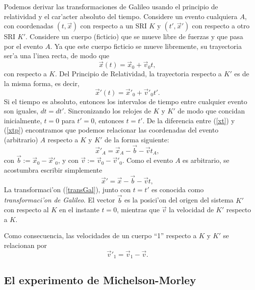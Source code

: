 Podemos derivar las transformaciones de Galileo usando el principio de
relatividad y el car'acter absoluto del tiempo. Considere un evento cualquiera
$A$, con coordenadas $(t,\vec{x})$ con respecto a un SRI $K$ y
$(t',\vec{x}') $ con respecto a otro SRI $K'$. Considere un cuerpo
(ficticio) que se mueve libre de fuerzas y que pasa por el evento $A$. Ya que
este cuerpo ficticio se mueve libremente, su trayectoria ser'a una l'inea recta,
de modo que
\begin{equation}
\vec{x}(t)=\vec{x}_0+\vec{v}_0 t, \label{xt}
\end{equation}
con respecto a $K$. Del Principio de Relatividad, la trayectoria respecto a $K'$
es de la misma forma, es decir,
\begin{equation}
\vec{x}'(t)=\vec{x}'_0+\vec{v}'_0 t'. \label{xtp}
\end{equation}
Si el tiempo es absoluto, entonces los intervalos de tiempo entre cualquier
evento son iguales, $dt=dt'$. Sincronizando los relojes de $K$ y $K'$ de modo
que concidan inicialmente, $t=0$ para $t'=0$, entonces $t=t'$. De la diferencia
entre (\ref{xt}) y (\ref{xtp}) encontramos que podemos relacionar las
coordenadas del evento (arbitrario) $A$ respecto a $K$ y $K'$ de la forma
siguiente:
\begin{equation}
\vec{x}'_A=\vec{x}_A-\vec{b}-\vec{v}t_A, \label{transGal0}
\end{equation}
con $\vec{b}:=\vec{x}_0-\vec{x}'_0$, y con $\vec{v}:=\vec{v}_0-\vec{v}'_0$. Como el evento $A$ es arbitrario, se acostumbra escribir simplemente
\begin{equation}
\vec{x}'=\vec{x}-\vec{b}-\vec{v}t, \label{transGal}
\end{equation}
 La transformaci'on  (\ref{transGal}), junto con $t=t'$ es conocida como \textit{transformaci'on de Galileo}. El vector $\vec{b}$ es la posici'on del origen del sistema $K'$ con respecto al $K$ en el instante $t=0$, mientras que $\vec{v}$ la velocidad de $K'$ respecto a $K$.

Como consecuencia, las velocidades de un cuerpo ``1'' respecto a $K$ y $K'$ se relacionan por
\begin{equation}
\vec{v}'_1=\vec{v}_1-\vec{v}. \label{transGalv}
\end{equation}

\subsection{El experimento de Michelson-Morley}

